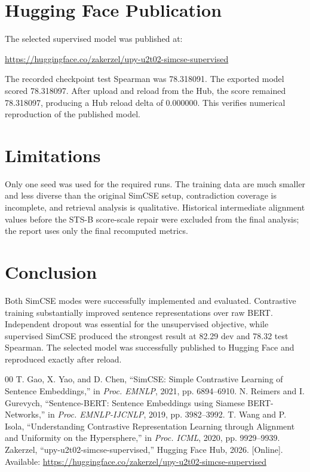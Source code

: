 \documentclass[10pt,conference]{IEEEtran}
\begin{document}
\section{Hugging Face Publication}
The selected supervised model was published at:

\url{https://huggingface.co/zakerzel/upy-u2t02-simcse-supervised}

The recorded checkpoint test Spearman was 78.318091. The exported model scored 78.318097. After upload and reload from the Hub, the score remained 78.318097, producing a Hub reload delta of 0.000000. This verifies numerical reproduction of the published model.

\section{Limitations}
Only one seed was used for the required runs. The training data are much smaller and less diverse than the original SimCSE setup, contradiction coverage is incomplete, and retrieval analysis is qualitative. Historical intermediate alignment values before the STS-B score-scale repair were excluded from the final analysis; the report uses only the final recomputed metrics.

\section{Conclusion}
Both SimCSE modes were successfully implemented and evaluated. Contrastive training substantially improved sentence representations over raw BERT. Independent dropout was essential for the unsupervised objective, while supervised SimCSE produced the strongest result at 82.29 dev and 78.32 test Spearman. The selected model was successfully published to Hugging Face and reproduced exactly after reload.

\begin{thebibliography}{00}
 T. Gao, X. Yao, and D. Chen, ``SimCSE: Simple Contrastive Learning of Sentence Embeddings,'' in \textit{Proc. EMNLP}, 2021, pp. 6894--6910.
 N. Reimers and I. Gurevych, ``Sentence-BERT: Sentence Embeddings using Siamese BERT-Networks,'' in \textit{Proc. EMNLP-IJCNLP}, 2019, pp. 3982--3992.
 T. Wang and P. Isola, ``Understanding Contrastive Representation Learning through Alignment and Uniformity on the Hypersphere,'' in \textit{Proc. ICML}, 2020, pp. 9929--9939.
 Zakerzel, ``upy-u2t02-simcse-supervised,'' Hugging Face Hub, 2026. [Online]. Available: \url{https://huggingface.co/zakerzel/upy-u2t02-simcse-supervised}
\end{thebibliography}
\end{document}
